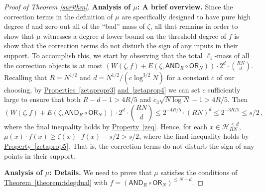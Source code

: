 \documentclass[11pt]{article}
\numberwithin{equation}{section}
\theoremstyle{definition}
\theoremstyle{plain}
\newcommand{\expref}[2]{\hyperref[#2]{#1~\ref{#2}}}
\newcommand{\expeqref}[2]{\hyperref[#2]{#1~\eqref{#2}}}
\newcommand{\OR}{\mathsf{ OR}}
\newcommand{\Hcal}{\mathcal{H}}
\newcommand{\AND}{\mathsf{AND}}
\begin{document}
\begin{proof}[Proof of Theorem \ref{surjthm}]
	
	
	\medskip
	\noindent \textbf{Analysis of $\mu$: A brief overview.}
	Since the correction terms in the definition of $\mu$ are specifically designed to have pure high degree $d$
	and zero out all of the ``bad'' mass of $\zeta$, all that remains in order to show that
	$\mu$ witnesses a degree $d$ lower bound on the threshold degree of $f$ is show that the correction terms do not
	disturb the sign of any inputs in their support. To accomplish this,
	we start by observing that the total $\ell_1$-mass of all the correction objects is at most $(W(\zeta, f)+E(\zeta, \AND_R \circ \OR_N)) \cdot 2^{d} \cdot {RN \choose d}$. 
	Recalling that $R=N^{1/2}$ and $d = N^{1/2}/(c \log^{3/2} N)$ for a constant $c$ of our choosing, by \expeqref{Properties}{zetapropr3} \expeqref{and}{zetaprop4} we can set $c$ sufficiently large to ensure that both 
	$R-d - 1 > 4R/5$ and $c_3 \sqrt{N \log N} -1 > 4R/5$.
	Then \begin{equation}
	\label{akeyeq} \left(W(\zeta, f)+E\left(\zeta, \AND_R \circ \OR_N\right)\right) \cdot 2^{d} \cdot {RN \choose d} \leq 2^{-4R/5} \cdot (RN)^d \leq  2^{-3R/5} \leq s/2\,,\end{equation} 
	where the final inequality holds by \expeqref{Property}{zeq}.
	Hence, for each $x \in \Hcal_{RN}^{\leq d}$,
	$\mu(x) \cdot f(x) \geq \zeta(x) \cdot f(x) - s/2 > s/2$, where the final inequality holds by \expeqref{Property}{zetaprop5}. That is, the correction terms do not disturb the sign of any points in their support.
	
	\medskip
	\noindent \textbf{Analysis of $\mu$: Details.} 
	We need to prove that $\mu$ satisfies the conditions of \expref{Theorem}{theorem:tdegdual} with $f=(\AND_R \circ \OR_N)^{\leq N + d}$. 
	

\end{proof}
\end{document}
